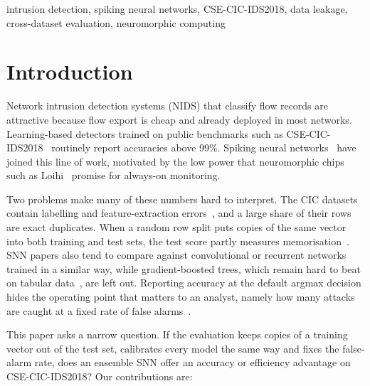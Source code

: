 \documentclass[conference]{IEEEtran}
\begin{document}
\begin{IEEEkeywords}
intrusion detection, spiking neural networks, CSE-CIC-IDS2018, data leakage, cross-dataset evaluation, neuromorphic computing
\end{IEEEkeywords}

\section{Introduction}

Network intrusion detection systems (NIDS) that classify flow records are attractive because flow export is cheap and already deployed in most networks. Learning-based detectors trained on public benchmarks such as CSE-CIC-IDS2018~\cite{sharafaldin2018} routinely report accuracies above 99\%. Spiking neural networks~\cite{maass1997} have joined this line of work, motivated by the low power that neuromorphic chips such as Loihi~\cite{davies2018,davies2021} promise for always-on monitoring.

Two problems make many of these numbers hard to interpret. The CIC datasets contain labelling and feature-extraction errors~\cite{engelen2021,liu2022,flood2024}, and a large share of their rows are exact duplicates. When a random row split puts copies of the same vector into both training and test sets, the test score partly measures memorisation~\cite{kaufman2012,arp2022}. SNN papers also tend to compare against convolutional or recurrent networks trained in a similar way, while gradient-boosted trees, which remain hard to beat on tabular data~\cite{grinsztajn2022,shwartzziv2022}, are left out. Reporting accuracy at the default argmax decision hides the operating point that matters to an analyst, namely how many attacks are caught at a fixed rate of false alarms~\cite{apruzzese2023sok}.

This paper asks a narrow question. If the evaluation keeps copies of a training vector out of the test set, calibrates every model the same way and fixes the false-alarm rate, does an ensemble SNN offer an accuracy or efficiency advantage on CSE-CIC-IDS2018? Our contributions are:
\end{document}

